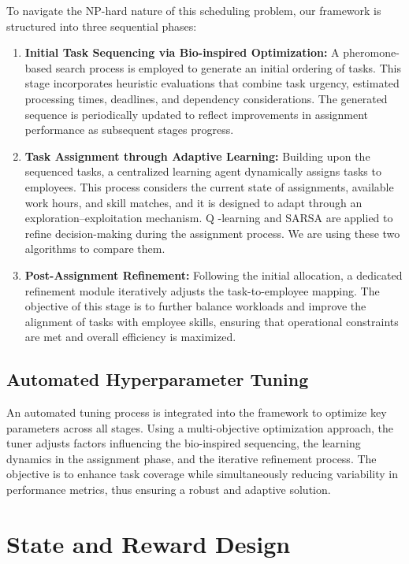 \documentclass[%
aip,
cp,  %
reprint
]{revtex4-2}
\begin{document}
	To navigate the NP-hard nature of this scheduling problem, our framework is structured
	into three sequential phases:
	
	\begin{enumerate}
		\item \textbf{Initial Task Sequencing via Bio-inspired Optimization:} A
		pheromone-based search process is employed to generate an initial ordering
		of tasks. This stage incorporates heuristic evaluations that combine task urgency,
		estimated processing times, deadlines, and dependency considerations. The generated
		sequence is periodically updated to reflect improvements in assignment performance
		as subsequent stages progress.
		
		\item \textbf{Task Assignment through Adaptive Learning:} Building upon the
		sequenced tasks, a centralized learning agent dynamically assigns tasks to
		employees. This process considers the current state of assignments, available
		work hours, and skill matches, and it is designed to adapt through an exploration–exploitation
		mechanism. Q -learning and SARSA are applied to refine
		decision-making during the assignment process. We are using these two algorithms to compare them.
		
		\item \textbf{Post-Assignment Refinement:} Following the initial allocation,
		a dedicated refinement module iteratively adjusts the task-to-employee mapping.
		The objective of this stage is to further balance workloads and improve
		the alignment of tasks with employee skills, ensuring that operational constraints
		are met and overall efficiency is maximized.
	\end{enumerate}
	
	\subsection{\label{subsec:tuning}Automated Hyperparameter Tuning}
	
	An automated tuning process is integrated into the framework to optimize key parameters
	across all stages. Using a multi-objective optimization approach, the tuner adjusts
	factors influencing the bio-inspired sequencing, the learning dynamics in the
	assignment phase, and the iterative refinement process. The objective is to
	enhance task coverage while simultaneously reducing variability in performance
	metrics, thus ensuring a robust and adaptive solution.
	
	\section{\label{sec:state}State and Reward Design}
	
\end{document}
